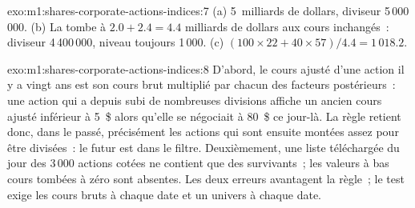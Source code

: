 \begin{solution}{exo:m1:shares-corporate-actions-indices:7}
(a)  5~milliards de dollars, diviseur 5\,000\,000. (b) La  tombe à
$2.0 + 2.4 = 4.4$ milliards de dollars aux cours inchangés~: diviseur 4\,400\,000, niveau
toujours 1\,000. (c) $(100\times22 + 40\times57)/4.4 = 1\,018.2$.
\end{solution}

\begin{solution}{exo:m1:shares-corporate-actions-indices:8}
D'abord, le cours ajusté d'une action il y a vingt ans est son cours brut multiplié par
chacun des facteurs postérieurs~: une action qui a depuis subi de nombreuses divisions affiche un ancien
cours ajusté inférieur à 5~\$ alors qu'elle se négociait à 80~\$ ce jour-là. La règle
retient donc, dans le passé, précisément les actions qui sont ensuite montées assez
pour être divisées~: le futur est dans le filtre. Deuxièmement, une liste téléchargée du jour
des 3\,000 actions cotées ne contient que des survivants~; les valeurs à bas cours tombées à
zéro sont absentes. Les deux erreurs avantagent la règle~; le test exige les cours bruts
à chaque date et un univers à chaque date.
\end{solution}

